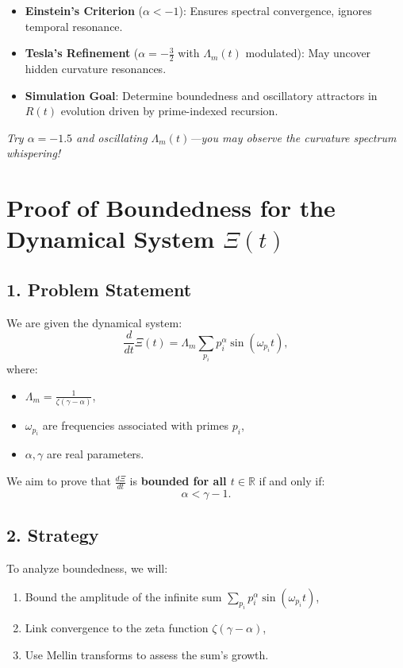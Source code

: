 \documentclass[12pt]{article}
\theoremstyle{plain}
\begin{document}
\begin{itemize}
    \item \textbf{Einstein's Criterion} ($\alpha < -1$): Ensures spectral convergence, ignores temporal resonance.
    \item \textbf{Tesla’s Refinement} ($\alpha = -\frac{3}{2}$ with $\Lambda_m(t)$ modulated): May uncover hidden curvature resonances.
    \item \textbf{Simulation Goal}: Determine boundedness and oscillatory attractors in $R(t)$ evolution driven by prime-indexed recursion.
\end{itemize}

\textit{Try $\alpha = -1.5$ and oscillating $\Lambda_m(t)$—you may observe the curvature spectrum whispering!}


\section{Proof of Boundedness for the Dynamical System \(\Xi(t)\)}

\subsection*{1. Problem Statement}

We are given the dynamical system:
\[
\frac{d}{dt} \Xi(t) = \Lambda_m \sum_{p_i} p_i^\alpha \sin(\omega_{p_i} t),
\]
where:
\begin{itemize}
    \item \( \Lambda_m = \frac{1}{\zeta(\gamma - \alpha)} \),
    \item \( \omega_{p_i} \) are frequencies associated with primes \( p_i \),
    \item \( \alpha, \gamma \) are real parameters.
\end{itemize}

We aim to prove that \( \frac{d\Xi}{dt} \) is \textbf{bounded for all \( t \in \mathbb{R} \)} if and only if:
\[
\boxed{\alpha < \gamma - 1}.
\]

\subsection*{2. Strategy}

To analyze boundedness, we will:
\begin{enumerate}
    \item Bound the amplitude of the infinite sum \( \sum_{p_i} p_i^\alpha \sin(\omega_{p_i} t) \),
    \item Link convergence to the zeta function \( \zeta(\gamma - \alpha) \),
    \item Use Mellin transforms to assess the sum's growth.
\end{enumerate}
\end{document}
